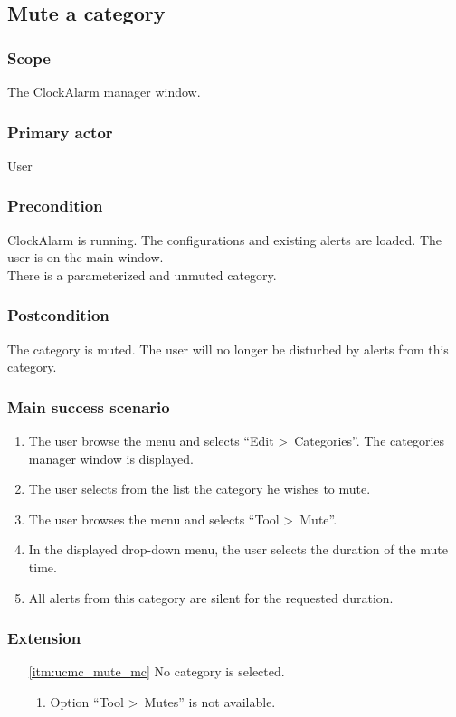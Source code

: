 \subsection{Mute a category}\label{subsec:usecase_mute_category}

\subsubsection{Scope}
The ClockAlarm manager window.
\subsubsection{Primary actor}
User
\subsubsection{Precondition}
ClockAlarm is running. The configurations and existing alerts are loaded. The user is on the main window.
\\There is a parameterized and unmuted category.
\subsubsection{Postcondition}
The category is muted. The user will no longer be disturbed by alerts from this category.
\subsubsection{Main success scenario}
\begin{enumerate}
	\item The user browse the menu and selects ``Edit \textgreater~Categories''. The categories manager window is displayed. 
	\item The user selects from the list the category he wishes to mute.
	\item \label{itm:ucmc_mute_mc}The user browses the menu and selects ``Tool \textgreater~Mute''.
	\item In the displayed drop-down menu, the user selects the duration of the mute time.
	\item All alerts from this category are silent for the requested duration.
\end{enumerate}
\subsubsection{Extension}
\begin{enumerate}
	\item[\ref{itm:ucmc_mute_mc}] No category is selected.
	\begin{enumerate}[i]
		\item Option ``Tool \textgreater~Mutes'' is not available.
	\end{enumerate}
\end{enumerate}

